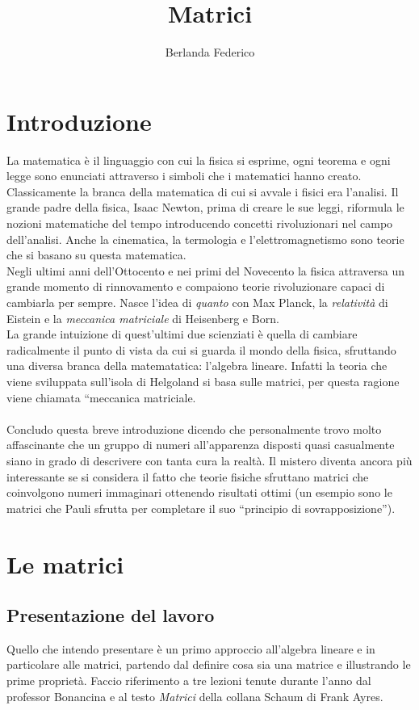 \documentclass[a4paper]{article}
\title{Matrici}
\author{Berlanda Federico}
\begin{document}
\maketitle

\section{Introduzione}

La matematica è il linguaggio con cui la fisica si esprime, ogni teorema e ogni legge sono enunciati attraverso i simboli che i matematici hanno creato.
\\Classicamente la branca della matematica di cui si avvale i fisici era l’analisi. Il grande padre della fisica, Isaac Newton, prima di creare le sue leggi, riformula le nozioni matematiche del tempo introducendo concetti rivoluzionari nel campo dell’analisi. Anche la cinematica, la termologia e l’elettromagnetismo sono teorie che si basano su questa matematica.
\\Negli ultimi anni dell’Ottocento e nei primi del Novecento la fisica attraversa un grande momento di rinnovamento e compaiono teorie rivoluzionare capaci di cambiarla per sempre. Nasce l’idea di \textit{quanto} con Max Planck, la \textit{relatività} di Eistein e la \textit{meccanica matriciale} di Heisenberg e Born.
\\La grande intuizione di quest’ultimi due scienziati è quella di cambiare radicalmente il punto di vista da cui si guarda il mondo della fisica, sfruttando una diversa branca della matematatica: l'algebra lineare. Infatti la teoria che viene sviluppata sull’isola di Helgoland si basa sulle matrici, per questa ragione viene chiamata “meccanica matriciale.
\\
\\Concludo questa breve introduzione dicendo che personalmente trovo molto affascinante che un gruppo di numeri all'apparenza disposti quasi casualmente siano in grado di descrivere con tanta cura la realtà. Il mistero diventa ancora più interessante se si considera il fatto che teorie fisiche sfruttano matrici che coinvolgono numeri immaginari ottenendo risultati ottimi (un esempio sono le matrici che Pauli sfrutta per completare il suo “principio di sovrapposizione”).

\section{Le matrici}

\subsection{Presentazione del lavoro}
Quello che intendo presentare è un primo approccio all’algebra lineare e in particolare alle matrici, partendo dal definire cosa sia una matrice e illustrando le prime proprietà. Faccio riferimento a tre lezioni tenute durante l’anno dal professor Bonancina e al testo {\it Matrici} della collana Schaum di Frank Ayres.
\end{document}
